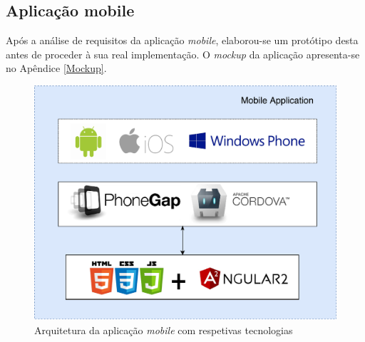 

















\subsection{Aplicação mobile}


Após a análise de requisitos da aplicação \textit{mobile}, elaborou-se um protótipo desta antes de proceder à sua real implementação. O \textit{mockup} da aplicação apresenta-se no Apêndice \ref{Mockup}. 

\begin{figure}[h]
	\centering
	\includegraphics[scale = 0.4]{esquemas/arquitetura-mobile.pdf}
	\caption{Arquitetura da aplicação \textit{mobile} com respetivas tecnologias}
	\label{arquiteturamobile}
\end{figure}

